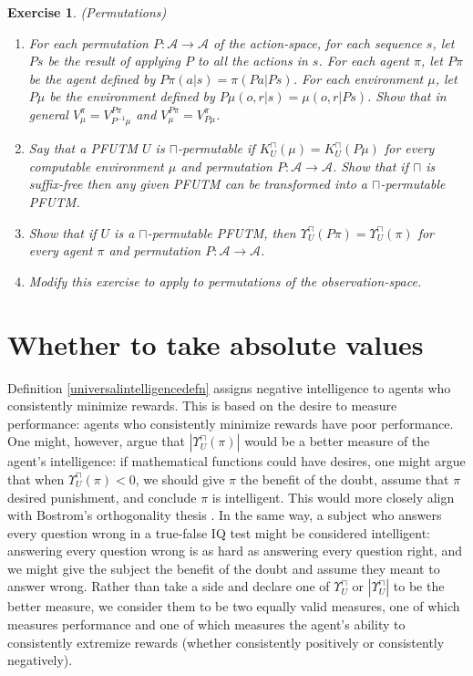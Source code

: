 \documentclass[runningheads]{llncs}
\newtheorem{myexercise}[mytheorem]{Exercise}
\def\LH{\Upsilon}
\begin{document}
\begin{myexercise} (Permutations)
    \begin{enumerate}
        \item
        For each permutation $P:\mathcal A\to\mathcal A$ of the action-space,
        for each sequence $s$,
        let $Ps$ be the result of applying $P$ to all the actions in $s$.
        For each agent $\pi$, let $P\pi$ be the agent defined by
        $P\pi(a|s)=\pi(Pa|Ps)$. For each environment $\mu$, let
        $P\mu$ be the environment defined by
        $P\mu(o,r|s)=\mu(o,r|Ps)$. Show that in general
        $V^\pi_\mu = V^{P\pi}_{P^{-1}\mu}$
        and
        $V^{P\pi}_\mu = V^\pi_{P\mu}$.
        \item
        Say that a PFUTM $U$ is \emph{$\sqcap$-permutable} if
        $K^\sqcap_U(\mu)=K^\sqcap_U(P\mu)$ for every computable environment $\mu$
        and permutation $P:\mathcal A\to\mathcal A$. Show that if $\sqcap$ is
        suffix-free then any given
        PFUTM can be transformed into a $\sqcap$-permutable PFUTM.
        \item
        Show that if $U$ is a $\sqcap$-permutable PFUTM,
        then $\LH^\sqcap_U(P\pi)=\LH^\sqcap_U(\pi)$
        for every agent $\pi$ and permutation $P:\mathcal A\to\mathcal A$.
        \item
        Modify this exercise to apply to permutations
        of the observation-space.
    \end{enumerate}
\end{myexercise}

\section{Whether to take absolute values}
\label{absvaluesection}

Definition \ref{universalintelligencedefn} assigns negative intelligence to agents
who consistently minimize rewards.
This is based on the desire to measure performance:
agents who consistently minimize rewards have
poor performance. One might, however, argue that $|\LH^\sqcap_U(\pi)|$ would be a
better measure of the agent's intelligence:
if mathematical functions could have desires, one might argue that
when $\LH^\sqcap_U(\pi)<0$, we should give $\pi$ the benefit of the doubt, assume
that $\pi$ desired punishment, and conclude $\pi$ is intelligent. This would more closely
align with Bostrom's orthogonality thesis \cite{bostrom2012superintelligent}.
In the same way, a subject who answers every question wrong in a true-false IQ test
might be considered intelligent: answering every question wrong
is as hard as answering every question right, and we might give the subject the benefit
of the doubt and assume they meant to answer wrong.
Rather than take a side and declare
one of $\LH^\sqcap_U$ or $|\LH^\sqcap_U|$ to be the better measure, we consider
them to be two equally valid measures, one of which measures performance and one of
which measures the agent's ability to consistently extremize rewards (whether
consistently positively or consistently negatively).
\end{document}
